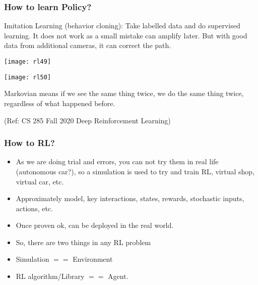 \begin{frame}[fragile]\frametitle{How to learn Policy?}

Imitation Learning (behavior cloning): Take labelled data and do supervised learning. It does not work as a small mistake can amplify later. But with good data from additional cameras, it can correct the path.


\begin{center}
\texttt{[image: rl49]}

\texttt{[image: rl50]}

\end{center}

Markovian means if we see the same thing twice, we do the same thing twice, regardless of what happened before.


{\tiny (Ref: CS 285 Fall 2020 Deep Reinforcement Learning)}

\end{frame}

\begin{frame}[fragile]\frametitle{How to RL?}

\begin{itemize}
\item As we are doing trial and errors, you can not try them in real life (autonomous car?), so a simulation is used to try and train RL, virtual shop, virtual car, etc.
\item Approximately model, key interactions, states, rewards, stochastic inputs, actions, etc.
\item Once proven ok, can be deployed in the real world.
\item So, there are two things in any RL problem
\item Simulation $==$ Environment
\item RL algorithm/Library $==$ Agent.
\end{itemize}
\end{frame}

